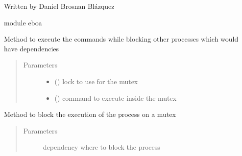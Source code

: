 Written by Daniel Brosnan Blázquez

module eboa

\begin{fulllineitems}
\label{\detokenize{eboa.triggering:eboa.triggering.eboa_triggering.block_and_execute_command}}
Method to execute the commands while blocking other processes which would have dependencies
\begin{quote}\begin{description}
\item[{Parameters}] \leavevmode\begin{itemize}
\item {} 
 () \textendash{} lock to use for the mutex

\item {} 
 () \textendash{} command to execute inside the mutex

\end{itemize}

\end{description}\end{quote}

\end{fulllineitems}


\begin{fulllineitems}
\label{\detokenize{eboa.triggering:eboa.triggering.eboa_triggering.block_process}}
Method to block the execution of the process on a mutex
\begin{quote}\begin{description}
\item[{Parameters}] \leavevmode
{} \textendash{} dependency where to block the process

\end{description}\end{quote}

\end{fulllineitems}

